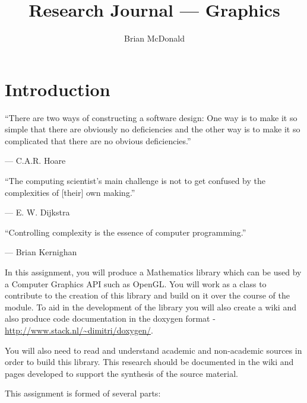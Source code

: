 \documentclass{../../fal_assignment}
\title{Research Journal --- Graphics}
\author{Brian McDonald}
\begin{document}
\maketitle

\section*{Introduction}

\begin{marginquote}
  ``There are two ways of constructing a software design: One way is to make it so simple that there are obviously no deficiencies and the other way is to make it so complicated that there are no obvious deficiencies.''
    
    --- C.A.R. Hoare
    
    \marginquoterule
    
    ``The computing scientist's main challenge is not to get confused by the complexities of [their] own making.''
    
    --- E. W. Dijkstra
    
    \marginquoterule

        ``Controlling complexity is the essence of computer programming.''
    
    --- Brian Kernighan
            
\end{marginquote}

In this assignment, you will produce a Mathematics library which can be used by a Computer Graphics API such as OpenGL. You will work as a class to contribute to the creation of this library and build on it over the course of the module. To aid in the development of the library you will also create a wiki and also produce code documentation in the doxygen format - \url{http://www.stack.nl/~dimitri/doxygen/}.

You will also need to read and understand academic and non-academic sources in order to build this library. This research should be documented in the wiki and pages developed to support the synthesis of the source material. 

This assignment is formed of several parts:
\end{document}
